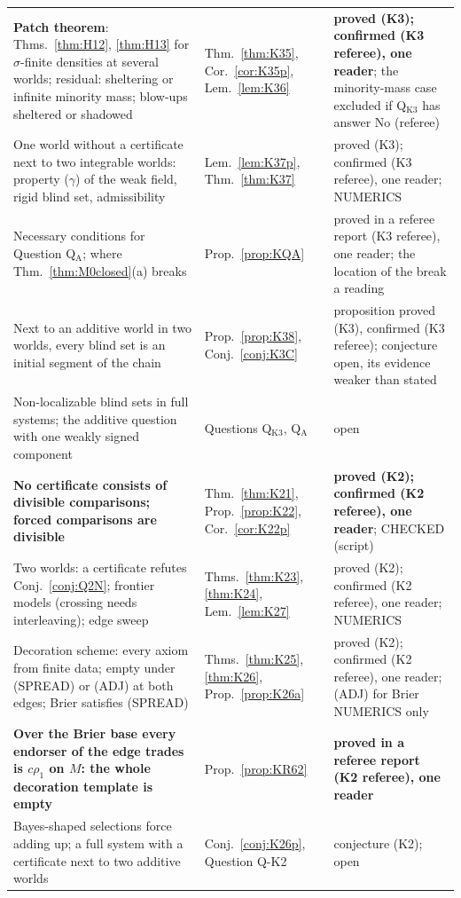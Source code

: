\documentclass[11pt]{article}
\theoremstyle{definition}
\theoremstyle{remark}
\begin{document}
{\begin{longtable}{>{\raggedright\arraybackslash}p{6.4cm}>{\raggedright\arraybackslash}p{2.1cm}>{\raggedright\arraybackslash}p{5.6cm}}
\textbf{Patch theorem}: Thms.~\ref{thm:H12}, \ref{thm:H13} for $\sigma$-finite densities at several worlds; residual: sheltering or infinite minority mass; blow-ups sheltered or shadowed & Thm.~\ref{thm:K35}, Cor.~\ref{cor:K35p}, Lem.~\ref{lem:K36} & \textbf{proved (K3); confirmed (K3 referee), one reader}; the minority-mass case excluded if Q$_{\mathrm{K3}}$ has answer No (referee)\\
One world without a certificate next to two integrable worlds: property ($\gamma$) of the weak field, rigid blind set, admissibility & Lem.~\ref{lem:K37p}, Thm.~\ref{thm:K37} & proved (K3); confirmed (K3 referee), one reader; NUMERICS\\
Necessary conditions for Question Q$_{\mathrm A}$; where Thm.~\ref{thm:M0closed}(a) breaks & Prop.~\ref{prop:KQA} & proved in a referee report (K3 referee), one reader; the location of the break a reading\\
Next to an additive world in two worlds, every blind set is an initial segment of the chain & Prop.~\ref{prop:K38}, Conj.~\ref{conj:K3C} & proposition proved (K3), confirmed (K3 referee); conjecture open, its evidence weaker than stated\\
Non-localizable blind sets in full systems; the additive question with one weakly signed component & Questions Q$_{\mathrm{K3}}$, Q$_{\mathrm A}$ & open\\
\textbf{No certificate consists of divisible comparisons; forced comparisons are divisible} & Thm.~\ref{thm:K21}, Prop.~\ref{prop:K22}, Cor.~\ref{cor:K22p} & \textbf{proved (K2); confirmed (K2 referee), one reader}; CHECKED (script)\\
Two worlds: a certificate refutes Conj.~\ref{conj:Q2N}; frontier models (crossing needs interleaving); edge sweep & Thms.~\ref{thm:K23}, \ref{thm:K24}, Lem.~\ref{lem:K27} & proved (K2); confirmed (K2 referee), one reader; NUMERICS\\
Decoration scheme: every axiom from finite data; empty under (SPREAD) or (ADJ) at both edges; Brier satisfies (SPREAD) & Thms.~\ref{thm:K25}, \ref{thm:K26}, Prop.~\ref{prop:K26a} & proved (K2); confirmed (K2 referee), one reader; (ADJ) for Brier NUMERICS only\\
\textbf{Over the Brier base every endorser of the edge trades is $c\rho_1$ on $M$: the whole decoration template is empty} & Prop.~\ref{prop:KR62} & \textbf{proved in a referee report (K2 referee), one reader}\\
Bayes-shaped selections force adding up; a full system with a certificate next to two additive worlds & Conj.~\ref{conj:K26p}, Question Q-K2 & conjecture (K2); open\\

\end{longtable}}
\end{document}
